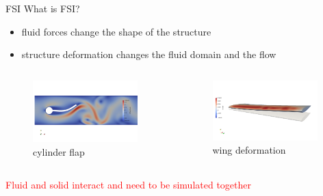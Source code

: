 \documentclass[10pt,t]{beamer}
\begin{document}
\begin{frame}{FSI}
What is FSI?

    \begin{itemize}
        \item fluid forces change the shape of the structure
        
        \item structure deformation changes the fluid domain and the flow
    \end{itemize}
    

    \begin{columns}
        \begin{figure}
            \centering
            \includegraphics[width=0.95\textwidth,trim=0 100 0 100,clip]{images/flap1.png}
            \caption{cylinder flap}
        \end{figure}
        \begin{figure}
            \centering
            \includegraphics[width=0.95\textwidth,trim=0 100 0 100,clip]{images/naca.png}
            \caption{wing deformation}
        \end{figure}
    \end{columns}
    
    \pause
    
    
    \vskip 5mm
    
   \textcolor{red}{Fluid and solid interact and need to be simulated together}
    
    
\end{frame}
\end{document}
